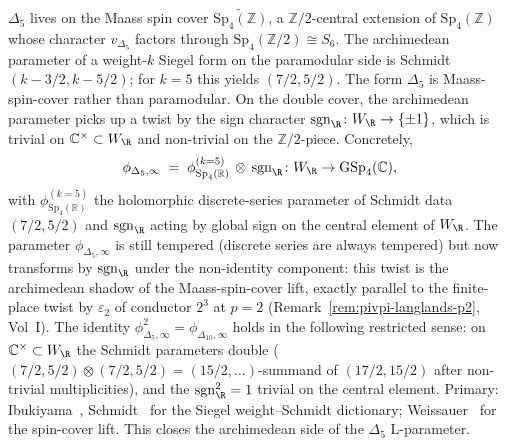 \begin{remark}
\label{rem:dl-archimedean-delta5}
$\Delta_5$ lives on the Maass spin cover
$\widetilde{\mathrm{Sp}_4(\mathbb{Z})}$, a $\mathbb{Z}/2$-central
extension of $\mathrm{Sp}_4(\mathbb{Z})$ whose character
$v_{\Delta_5}$ factors through $\mathrm{Sp}_4(\mathbb{Z}/2) \cong S_6$.
The archimedean parameter of a weight-$k$ Siegel form on the
paramodular side is Schmidt $(k - 3/2, k - 5/2)$; for $k = 5$
this yields $(7/2, 5/2)$. The form $\Delta_5$ is Maass-spin-cover
rather than paramodular. On the double cover, the archimedean
parameter picks up a twist by the sign character
$\mathrm{sgn}_\R\colon W_\R \to \{\pm 1\}$, which is trivial on
$\mathbb{C}^\times \subset W_\R$ and non-trivial on the
$\mathbb{Z}/2$-piece. Concretely,
\begin{equation}
\label{eq:phi-delta5-infty}
 \phi_{\Delta_5, \infty}
 \;=\;
 \phi^{(k=5)}_{\mathrm{Sp}_4(\mathbb{R})} \,\otimes\, \mathrm{sgn}_\R
 \colon W_\R \to \mathrm{GSp}_4(\mathbb{C}),
\end{equation}
with $\phi^{(k=5)}_{\mathrm{Sp}_4(\mathbb{R})}$ the holomorphic
discrete-series parameter of Schmidt data $(7/2, 5/2)$ and
$\mathrm{sgn}_\R$ acting by global sign on the central element of
$W_\R$. The parameter $\phi_{\Delta_5, \infty}$ is still tempered
(discrete series are always tempered) but now transforms by
$\mathrm{sgn}_\R$ under the non-identity component: this twist is the
archimedean shadow of the Maass-spin-cover lift, exactly parallel to
the finite-place twist by $\varepsilon_2$ of conductor $2^3$ at
$p = 2$ (Remark~\ref{rem:pivpi-langlands-p2}, Vol~I). The identity $\phi_{\Delta_5, \infty}^2 =
\phi_{\Delta_{10}, \infty}$ holds in the following restricted sense:
on $\mathbb{C}^\times \subset W_\R$ the Schmidt parameters double
($(7/2, 5/2) \otimes (7/2, 5/2) = (15/2, \ldots)$-summand of
$(17/2, 15/2)$ after non-trivial multiplicities), and the
$\mathrm{sgn}_\R^2 = 1$ trivial on the central element. Primary:
Ibukiyama~\cite{Ibukiyama1998Paramodular},
Schmidt~\cite{Schmidt2017Archimedean} for the Siegel weight--Schmidt
dictionary; Weissauer~\cite{Weissauer2009GSp4} for the spin-cover lift.
This closes the archimedean side of the $\Delta_5$ L-parameter.
\end{remark}

